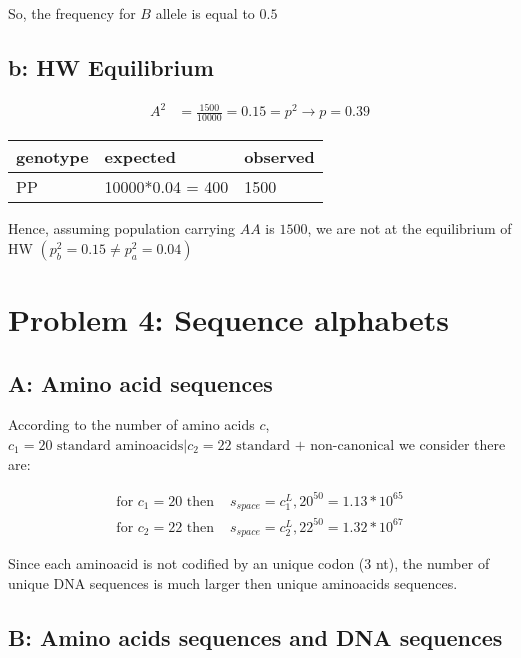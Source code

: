 So, the frequency for $B$ allele is equal to $0.5$

\subsection{b: HW Equilibrium}

\begin{align}
A^2 &= \frac{1500}{10000} = 0.15 = p^2 \rightarrow p = 0.39 
\end{align}
\begin{center}
\begin{tabular}{|l|l|l|}
\hline genotype & expected & observed \\ 
\hline PP & 10000*0.04 = 400 & 1500 \\ 
\hline 
\end{tabular} 
\end{center}

Hence, assuming population carrying $AA$ is $1500$, we are not at the equilibrium of HW $(p^{2}_b = 0.15 \neq p^{2}_a = 0.04)$

\setcounter{chapter}{4}
\setcounter{section}{0}
\section{Problem 4: Sequence alphabets}

\subsection{A: Amino acid sequences}

According to the number of amino acids $c$, $c_1 = 20 \text{ standard aminoacids} | c_2 = 22 \text{ standard + non-canonical}$ we consider there are:

\begin{align}
\text{for } c_1 = 20 \text{ then } &s_{space} = c_1^L, 20^{50} = 1.13*10^{65}\\
\text{for } c_2 = 22 \text{ then } &s_{space} = c_2^L, 22^{50} = 1.32*10^{67}
\end{align}

Since each aminoacid is not codified by an unique codon (3 nt), the number of unique DNA sequences is much larger then unique aminoacids sequences.


\subsection{B: Amino acids sequences and DNA sequences}

